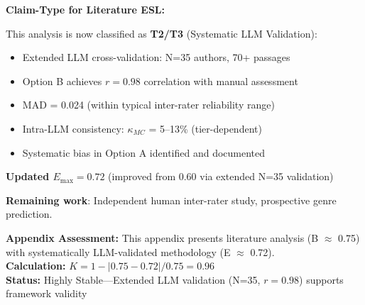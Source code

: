 \documentclass[11pt,a4paper]{article}
\begin{document}
\begin{warningbox}
\textbf{Claim-Type for Literature ESL:}

This analysis is now classified as \textbf{T2/T3} (Systematic LLM Validation):
\begin{itemize}
    \item Extended LLM cross-validation: N=35 authors, 70+ passages
    \item Option B achieves $r = 0.98$ correlation with manual assessment
    \item MAD = 0.024 (within typical inter-rater reliability range)
    \item Intra-LLM consistency: $\kappa_{MC}$ = 5--13\% (tier-dependent)
    \item Systematic bias in Option A identified and documented
\end{itemize}

\textbf{Updated $E_{\max} = 0.72$} (improved from 0.60 via extended N=35 validation)

\textbf{Remaining work}: Independent human inter-rater study, prospective genre prediction.
\end{warningbox}

\begin{eslbox}
\textbf{Appendix Assessment:} This appendix presents literature analysis (B $\approx$ 0.75) with systematically LLM-validated methodology (E $\approx$ 0.72). \\[0.3em]
\textbf{Calculation:} $K = 1 - |0.75 - 0.72| / 0.75 = 0.96$ \\
\textbf{Status:} \textcolor{green!60!black}{Highly Stable}---Extended LLM validation (N=35, $r=0.98$) supports framework validity
\end{eslbox}
\end{document}
